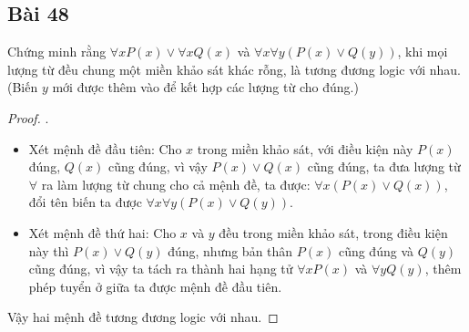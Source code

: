 \subsection*{Bài 48}
Chứng minh rằng $\forall xP(x)\lor\forall xQ(x)$ và $\forall x\forall y(P(x)\lor Q(y))$, khi mọi lượng từ đều chung một miền khảo sát khác rỗng, là tương đương logic với nhau. (Biến $y$ mới được thêm vào để kết hợp các lượng từ cho đúng.)
\begin{proof}.
    \begin{itemize}
        \item Xét mệnh đề đầu tiên: Cho $x$ trong miền khảo sát, với điều kiện này $P(x)$ đúng, $Q(x)$ cũng đúng, vì vậy $P(x)\lor Q(x)$ cũng đúng, ta đưa lượng từ $\forall$ ra làm lượng từ chung cho cả mệnh đề, ta được: $\forall x(P(x)\lor Q(x))$, đổi tên biến ta được $\forall x\forall y(P(x)\lor Q(y))$.
        \item Xét mệnh đề thứ hai: Cho $x$ và $y$ đều trong miền khảo sát, trong điều kiện này thì $P(x)\lor Q(y)$ đúng, nhưng bản thân $P(x)$ cũng đúng và $Q(y)$ cũng đúng, vì vậy ta tách ra thành hai hạng tử $\forall xP(x)$ và $\forall yQ(y)$, thêm phép tuyển ở giữa ta được mệnh đề đầu tiên.
    \end{itemize}
    Vậy hai mệnh đề tương đương logic với nhau.
\end{proof}
